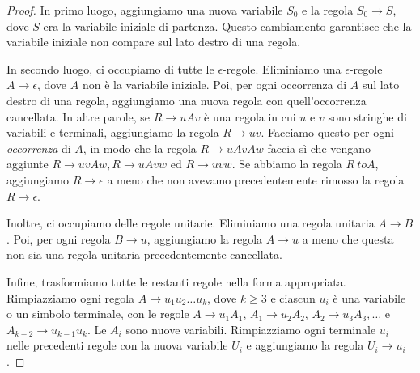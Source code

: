\documentclass[12pt]{report}
\begin{document}
\begin{proof}
	In primo luogo, aggiungiamo una nuova variabile $S_0$ e la regola $S_0 \to S$, dove $S$ era la variabile iniziale di partenza. Questo cambiamento garantisce che la variabile iniziale non compare sul lato destro di una regola.

	In secondo luogo, ci occupiamo di tutte le $\epsilon$-regole. Eliminiamo una $\epsilon$-regole $A \to \epsilon$, dove $A$ non è la variabile iniziale. Poi, per ogni occorrenza di $A$ sul lato destro di una regola, aggiungiamo una nuova regola con quell'occorrenza cancellata. In altre parole, se $R \to uAv$ è una regola in cui $u$ e $v$ sono stringhe di variabili e terminali, aggiungiamo la regola $R \to uv$. Facciamo questo per ogni \textit{occorrenza} di $A$, in modo che la regola $R \to uAvAw$ faccia sì che vengano aggiunte $R \to uvAw, R \to uAvw$ ed $R \to uvw$. Se abbiamo la regola $R\ to A$, aggiungiamo $R \to \epsilon$ a meno che non avevamo precedentemente rimosso la regola $R \to \epsilon$.

	Inoltre, ci occupiamo delle regole unitarie. Eliminiamo una regola unitaria $A \to B$. Poi, per ogni regola $B \to u$, aggiungiamo la regola $A \to u$ a meno che questa non sia una regola unitaria precedentemente cancellata.

	Infine, trasformiamo tutte le restanti regole nella forma appropriata. Rimpiazziamo ogni regola $A \to u_1u_2\dots u_k$, dove $k \geq 3$ e ciascun $u_i$ è una variabile o un simbolo terminale, con le regole $A \to u_1A_1$, $A_1 \to u_2A_2$,  $A_2 \to u_3A_3, \dots$ e $A_{k-2} \to u_{k-1}u_k$. Le $A_i$ sono nuove variabili. Rimpiazziamo ogni terminale $u_i$ nelle precedenti regole con la nuova variabile $U_i$ e aggiungiamo la regola $U_i \to u_i$.
\end{proof}
\end{document}
